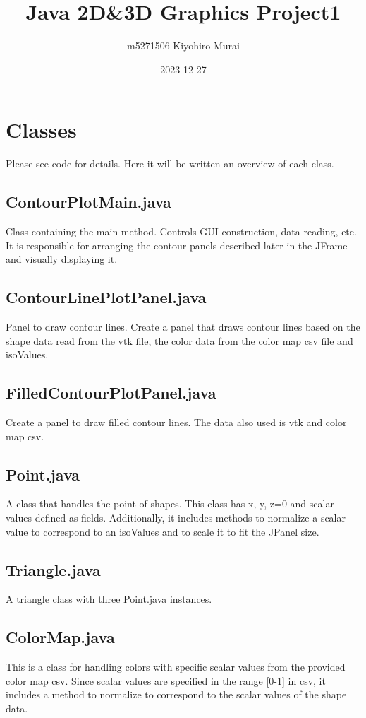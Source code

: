 \documentclass[12pt]{article}
\title{Java 2D\&3D Graphics Project1}
\author{m5271506 Kiyohiro Murai}
\date{2023-12-27}
\begin{document}
\maketitle
\tableofcontents
\newpage

\section{Classes}
Please see code for details. Here it will be written an overview of each class.
\subsection{ContourPlotMain.java}
Class containing the main method. Controls GUI construction, data reading, etc. It is responsible for arranging the contour panels described later in the JFrame and visually displaying it.
\subsection{ContourLinePlotPanel.java}
Panel to draw contour lines. Create a panel that draws contour lines based on the shape data read from the vtk file, the color data from the color map csv file and isoValues.
\subsection{FilledContourPlotPanel.java}
Create a panel to draw filled contour lines. The data also used is vtk and color map csv.
\subsection{Point.java}
A class that handles the point of shapes. This class has x, y, z=0 and scalar values defined as fields. Additionally, it includes methods to normalize a scalar value to correspond to an isoValues and to scale it to fit the JPanel size.
\subsection{Triangle.java}
A triangle class with three Point.java instances.
\subsection{ColorMap.java}
This is a class for handling colors with specific scalar values from the provided color map csv. Since scalar values are specified in the range [0-1] in csv, it includes a method to normalize to correspond to the scalar values of the shape data.
\end{document}
